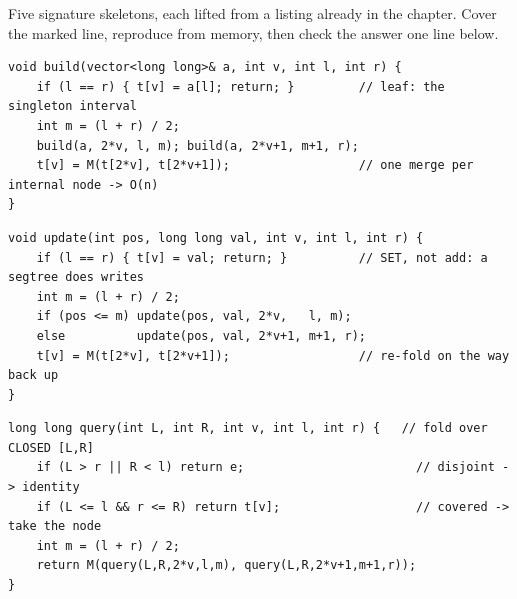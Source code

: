
Five signature skeletons, each lifted from a listing already in the chapter.
Cover the marked line, reproduce from memory, then check the answer one line
below.

\begin{lstlisting}[caption={Drill 1 -- build: fold leaves up to the root (from lst:c13-build)}]
void build(vector<long long>& a, int v, int l, int r) {
    if (l == r) { t[v] = a[l]; return; }         // leaf: the singleton interval
    int m = (l + r) / 2;
    build(a, 2*v, l, m); build(a, 2*v+1, m+1, r);
    t[v] = M(t[2*v], t[2*v+1]);                  // one merge per internal node -> O(n)
}
\end{lstlisting}

\begin{lstlisting}[caption={Drill 2 -- point update: set A[pos]=val, retrace one root path (from lst:c13-update)}]
void update(int pos, long long val, int v, int l, int r) {
    if (l == r) { t[v] = val; return; }          // SET, not add: a segtree does writes
    int m = (l + r) / 2;
    if (pos <= m) update(pos, val, 2*v,   l, m);
    else          update(pos, val, 2*v+1, m+1, r);
    t[v] = M(t[2*v], t[2*v+1]);                  // re-fold on the way back up
}
\end{lstlisting}

\begin{lstlisting}[caption={Drill 3 -- closed-range query: fold the canonical cover (from lst:c13-query)}]
long long query(int L, int R, int v, int l, int r) {   // fold over CLOSED [L,R]
    if (L > r || R < l) return e;                        // disjoint -> identity
    if (L <= l && r <= R) return t[v];                   // covered -> take the node
    int m = (l + r) / 2;
    return M(query(L,R,2*v,l,m), query(L,R,2*v+1,m+1,r));
}
\end{lstlisting}

